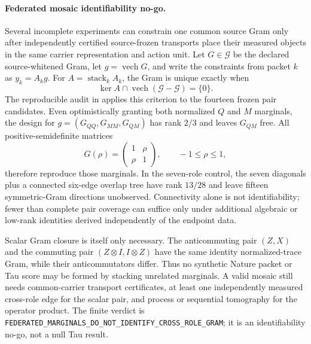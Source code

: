 \paragraph{Federated mosaic identifiability no-go.}
Several incomplete experiments can constrain one common source Gram only
after independently certified source-frozen transports place their measured
objects in the same carrier representation and action unit.  Let
$G\in\mathcal G$ be the declared source-whitened Gram, let
$g=\operatorname{vech}G$, and write the constraints from packet $k$ as
$y_k=A_kg$.  For $A=\operatorname{stack}_kA_k$, the Gram is unique exactly
when
\begin{equation}
 \ker A\cap\operatorname{vech}(\mathcal G-\mathcal G)=\{0\}.
 \label{eq:federatedgramcriterion}
\end{equation}
The reproducible audit in
 applies this criterion to
the fourteen frozen pair candidates.  Even optimistically granting both
normalized $Q$ and $M$ marginals, the design for
$g=(G_{QQ},G_{MM},G_{QM})$ has rank $2/3$ and leaves $G_{QM}$ free.  All
positive-semidefinite matrices
\begin{equation}
 G(\rho)=\begin{pmatrix}1&\rho\\\rho&1\end{pmatrix},
 \qquad -1\leq\rho\leq1,
 \label{eq:federatedpairfamily}
\end{equation}
therefore reproduce those marginals.  In the seven-role control, the seven
diagonals plus a connected six-edge overlap tree have rank $13/28$ and leave
fifteen symmetric-Gram directions unobserved.  Connectivity alone is not
identifiability; fewer than complete pair coverage can suffice only under
additional algebraic or low-rank identities derived independently of the
endpoint data.

Scalar Gram closure is itself only necessary.  The anticommuting pair
$(Z,X)$ and the commuting pair $(Z\otimes I,I\otimes Z)$ have the same
identity normalized-trace Gram, while their anticommutators differ.  Thus no
synthetic Nature packet or Tau score may be formed by stacking unrelated
marginals.  A valid mosaic still needs common-carrier transport certificates,
at least one independently measured cross-role edge for the scalar pair, and
process or sequential tomography for the operator product.  The finite
verdict is
\texttt{FEDERATED\_MARGINALS\_DO\_NOT\_IDENTIFY\_CROSS\_ROLE\_GRAM}; it is an
identifiability no-go, not a null Tau result.

